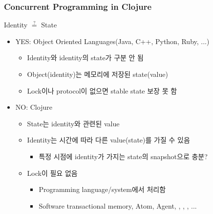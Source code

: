 \begin{frame}[fragile]
\frametitle{Concurrent Programming in Clojure}

\begin{center}
Identity $\stackrel{?}{=}$ State
\end{center}

\begin{itemize}
\item YES: Object Oriented Languages(Java, C++, Python, Ruby, ...)
  \begin{itemize}
  \item Identity와 identity의 state가 구분 안 됨
  \item Object(identity)는 메모리에 저장된 state(value)
  \item Lock이나 protocol이 없으면 stable state 보장 못 함
  \end{itemize}
\item NO: Clojure
  \begin{itemize}
  \item State는 identity와 관련된 value
  \item Identity는 시간에 따라 다른 value(state)를 가질 수 있음
    \begin{itemize}
    \item 특정 시점에 identity가 가지는 state의 snapshot으로 충분?
    \end{itemize}
  \item Lock이 필요 없음
    \begin{itemize}
    \item Programming language/system에서 처리함
    \item Software transactional memory, Atom, Agent, , , , ...
    \end{itemize}
  \end{itemize}
\end{itemize}


\end{frame}


